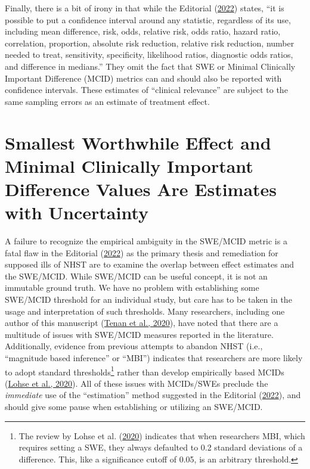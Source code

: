 \documentclass[]{cik}%
\begin{document}
Finally, there is a bit of irony in that while the Editorial
(\protect\hyperlink{ref-elkins2022}{2022}) states, ``it is possible to
put a confidence interval around any statistic, regardless of its use,
including mean difference, risk, odds, relative risk, odds ratio, hazard
ratio, correlation, proportion, absolute risk reduction, relative risk
reduction, number needed to treat, sensitivity, specificity, likelihood
ratios, diagnostic odds ratios, and difference in medians.'' They omit
the fact that SWE or Minimal Clinically Important Difference (MCID)
metrics can and should also be reported with confidence intervals. These
estimates of ``clinical relevance'' are subject to the same sampling
errors as an estimate of treatment effect.

\hypertarget{smallest-worthwhile-effect-and-minimal-clinically-important-difference-values-are-estimates-with-uncertainty}{%
\section{Smallest Worthwhile Effect and Minimal Clinically Important
Difference Values Are Estimates with
Uncertainty}\label{smallest-worthwhile-effect-and-minimal-clinically-important-difference-values-are-estimates-with-uncertainty}}

A failure to recognize the empirical ambiguity in the SWE/MCID metric is
a fatal flaw in the Editorial (\protect\hyperlink{ref-elkins2022}{2022})
as the primary thesis and remediation for supposed ills of NHST are to
examine the overlap between effect estimates and the SWE/MCID. While
SWE/MCID can be useful concept, it is not an immutable ground truth. We
have no problem with establishing some SWE/MCID threshold for an
individual study, but care has to be taken in the usage and
interpretation of such thresholds. Many researchers, including one
author of this manuscript (\protect\hyperlink{ref-tenan2020}{Tenan et
al., 2020}), have noted that there are a multitude of issues with
SWE/MCID measures reported in the literature. Additionally, evidence
from previous attempts to abandon NHST (i.e., ``magnitude based
inference'' or ``MBI'') indicates that researchers are more likely to
adopt standard thresholds\footnote{The review by Lohse et al.
  (\protect\hyperlink{ref-lohse2020systematic}{2020}) indicates that
  when researchers MBI, which requires setting a SWE, they always
  defaulted to 0.2 standard deviations of a difference. This, like a
  significance cutoff of 0.05, is an arbitrary threshold.} rather than
develop empirically based MCIDs
(\protect\hyperlink{ref-lohse2020systematic}{Lohse et al., 2020}). All
of these issues with MCIDs/SWEs preclude the \emph{immediate} use of the
``estimation'' method suggested in the Editorial
(\protect\hyperlink{ref-elkins2022}{2022}), and should give some pause
when establishing or utilizing an SWE/MCID.
\end{document}
